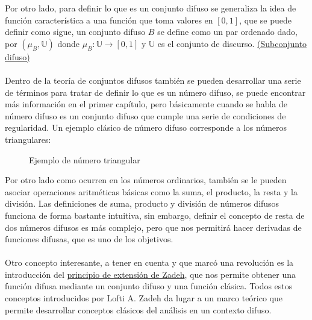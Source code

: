 Por otro lado, para definir lo que es un conjunto difuso se generaliza la idea de función característica a una función que toma valores en $[0, 1]$, que se puede definir como sigue, un conjunto difuso $B$ se define como un par ordenado dado, por $(\mu_B, \mathbb{U})$ donde $\mu_B : \mathbb{U} \longrightarrow [0,1]$ y $\mathbb{U}$ es el conjunto de discurso. \hyperref[def:subconjunto_difuso]{(Subconjunto difuso)} \\ \\
Dentro de la teoría de conjuntos difusos también se pueden desarrollar una serie de términos para tratar de definir lo que es un número difuso, se puede encontrar más información en el primer capítulo, pero básicamente cuando se habla de número difuso es un conjunto difuso que cumple una serie de condiciones de regularidad. Un ejemplo clásico de número difuso corresponde a los números triangulares:
\begin{figure}[H]
	\centering
	\caption{Ejemplo de número triangular}
\end{figure}
Por otro lado como ocurren en los números ordinarios, también se le pueden asociar operaciones aritméticas básicas como la suma, el producto, la resta y la división. Las definiciones de suma, producto y división de números difusos funciona de forma bastante intuitiva, sin embargo, definir el concepto de resta de dos números difusos es más complejo, pero que nos permitirá hacer derivadas de funciones difusas, que es uno de los objetivos.
\\ \\
Otro concepto interesante, a tener en cuenta y que marcó una revolución es la introducción del \hyperref[def:zadeh]{principio de extensión de Zadeh}, que nos permite obtener una función difusa mediante un conjunto difuso y una función clásica. Todos estos conceptos introducidos por Lofti A. Zadeh da lugar a un marco teórico que permite desarrollar conceptos clásicos del análisis en un contexto difuso.

